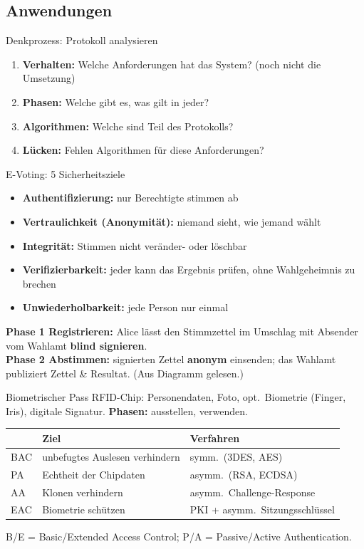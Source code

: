 \documentclass[a4paper, fontsize=7pt]{scrartcl}
\renewcommand*{\arraystretch}{1.5}  %
\begin{document}
\subsection{Anwendungen}

\begin{subbox}{Denkprozess: Protokoll analysieren}
\begin{enumerate}
    \item \textbf{Verhalten:} Welche Anforderungen hat das System? (noch nicht
          die Umsetzung)
    \item \textbf{Phasen:} Welche gibt es, was gilt in jeder?
    \item \textbf{Algorithmen:} Welche sind Teil des Protokolls?
    \item \textbf{Lücken:} Fehlen Algorithmen für diese Anforderungen?
\end{enumerate}
\end{subbox}

\begin{mainbox}{E-Voting: 5 Sicherheitsziele}
\begin{itemize}
    \item \textbf{Authentifizierung:} nur Berechtigte stimmen ab
    \item \textbf{Vertraulichkeit (Anonymität):} niemand sieht, wie jemand wählt
    \item \textbf{Integrität:} Stimmen nicht veränder- oder löschbar
    \item \textbf{Verifizierbarkeit:} jeder kann das Ergebnis prüfen, ohne
          Wahlgeheimnis zu brechen
    \item \textbf{Unwiederholbarkeit:} jede Person nur einmal
\end{itemize}
\textbf{Phase 1 Registrieren:} Alice lässt den Stimmzettel im Umschlag mit Absender
vom Wahlamt \textbf{blind signieren}.\\
\textbf{Phase 2 Abstimmen:} signierten Zettel \textbf{anonym} einsenden; das
Wahlamt publiziert Zettel \& Resultat. (Aus Diagramm gelesen.)
\end{mainbox}

\begin{mainbox}{Biometrischer Pass}
RFID-Chip: Personendaten, Foto, opt.\ Biometrie (Finger, Iris), digitale
Signatur. \textbf{Phasen:} ausstellen, verwenden.
\renewcommand*{\arraystretch}{1.15}
\setlength{\tabcolsep}{3pt}
\begin{tabularx}{\linewidth}{@{}l|>{\raggedright\arraybackslash}X|>{\raggedright\arraybackslash}X@{}}
 & \textbf{Ziel} & \textbf{Verfahren} \\
\hline
BAC & unbefugtes Auslesen verhindern & symm.\ (3DES, AES) \\
PA & Echtheit der Chipdaten & asymm.\ (RSA, ECDSA) \\
AA & Klonen verhindern & asymm.\ Challenge-Response \\
EAC & Biometrie schützen & PKI + asymm.\ Sitzungsschlüssel \\
\end{tabularx}
B/E = Basic/Extended Access Control; P/A = Passive/Active Authentication.
\end{mainbox}
\end{document}
